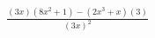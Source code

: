 \documentclass[preview]{standalone}
\begin{document}
\begin{align*}
\frac{(3x)(8x^2+1)-(2x^3+x)(3)}{(3x)^2}
\end{align*}
\end{document}

